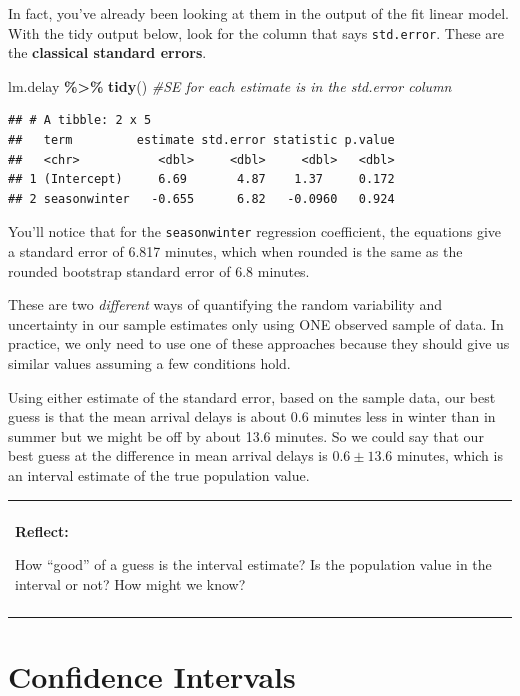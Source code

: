 \documentclass[
]{book}
\newenvironment{Shaded}{\begin{snugshade}}{\end{snugshade}}
\newcommand{\CommentTok}[1]{\textcolor[rgb]{0.56,0.35,0.01}{\textit{#1}}}
\newcommand{\FunctionTok}[1]{\textcolor[rgb]{0.13,0.29,0.53}{\textbf{#1}}}
\newcommand{\NormalTok}[1]{#1}
\newcommand{\SpecialCharTok}[1]{\textcolor[rgb]{0.81,0.36,0.00}{\textbf{#1}}}
\newenvironment{reflect}
{
    \begin{center}
    
    \begin{tabular}{|p{0.8\textwidth}|}
    \rowcolor{LightBlue}
    \hline\\
    \rowcolor{LightBlue}
    \textbf{Reflect:}
}
{
    \\\rowcolor{LightBlue}
    \\\hline
    \end{tabular} 
    \end{center}
}
\begin{document}
In fact, you've already been looking at them in the output of the fit linear model. With the tidy output below, look for the column that says \texttt{std.error}. These are the \textbf{classical standard errors}.

\begin{Shaded}
\begin{Highlighting}[]
\NormalTok{lm.delay }\SpecialCharTok{\%\textgreater{}\%} 
  \FunctionTok{tidy}\NormalTok{() }\CommentTok{\#SE for each estimate is in the std.error column}
\end{Highlighting}
\end{Shaded}

\begin{verbatim}
## # A tibble: 2 x 5
##   term         estimate std.error statistic p.value
##   <chr>           <dbl>     <dbl>     <dbl>   <dbl>
## 1 (Intercept)     6.69       4.87    1.37     0.172
## 2 seasonwinter   -0.655      6.82   -0.0960   0.924
\end{verbatim}

You'll notice that for the \texttt{seasonwinter} regression coefficient, the equations give a standard error of 6.817 minutes, which when rounded is the same as the rounded bootstrap standard error of 6.8 minutes.

These are two \emph{different} ways of quantifying the random variability and uncertainty in our sample estimates only using ONE observed sample of data. In practice, we only need to use one of these approaches because they should give us similar values assuming a few conditions hold.

Using either estimate of the standard error, based on the sample data, our best guess is that the mean arrival delays is about 0.6 minutes less in winter than in summer but we might be off by about 13.6 minutes. So we could say that our best guess at the difference in mean arrival delays is \(0.6\pm 13.6\) minutes, which is an interval estimate of the true population value.

\begin{reflect}
How ``good'' of a guess is the interval estimate? Is the population
value in the interval or not? How might we know?
\end{reflect}

\section{Confidence Intervals}\label{confidence-intervals}
\end{document}
